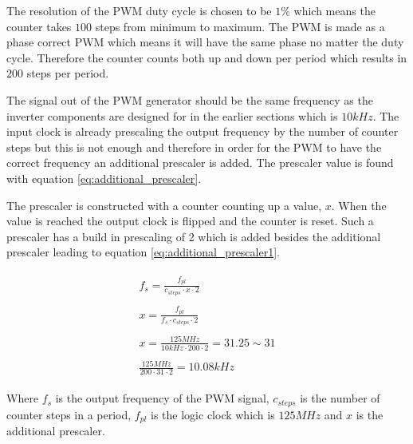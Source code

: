 The resolution of the PWM duty cycle is chosen to be $1\%$ which means the counter takes $100$ steps from minimum to maximum. The PWM is made as a phase correct PWM which means it will have the same phase no matter the duty cycle. Therefore the counter counts both up and down per period which results in $200$ steps per period. 

The signal out of the PWM generator should be the same frequency as the inverter components are designed for in the earlier sections which is $10kHz$. The input clock is already prescaling the output frequency by the number of counter steps but this is not enough and therefore in order for the PWM to have the correct frequency an additional prescaler is added. The prescaler value is found with equation \ref{eq:additional_prescaler}.

The prescaler is constructed with a counter counting up a value, $x$. When the value is reached the output clock is flipped and the counter is reset. Such a prescaler has a build in prescaling of 2 which is added besides the additional prescaler leading to equation \ref{eq:additional_prescaler1}.



\begin{subequations}
    \begin{align}
        \begin{split}
            f_{s} = \frac{f_{pl}}{c_{steps} \cdot x \cdot 2}
            \label{eq:additional_prescaler1}
        \end{split} \\ 
        \begin{split}
             x = \frac{f_{pl}}{f_{s} \cdot c_{steps} \cdot 2}
        \end{split} \\ 
        \begin{split}
            x = \frac{125MHz}{10kHz \cdot 200 \cdot 2} = 31.25 \sim 31
            \label{eq:additional_prescaler}
        \end{split} \\
        \begin{split}
            \frac{125MHz}{200 \cdot 31 \cdot 2} = 10.08kHz
        \end{split}
    \end{align}
\end{subequations}

Where $f_{s}$ is the output frequency of the PWM signal, $c_{steps}$ is the number of counter steps in a period, $f_{pl}$ is the logic clock which is $125MHz$ and $x$ is the additional prescaler.

